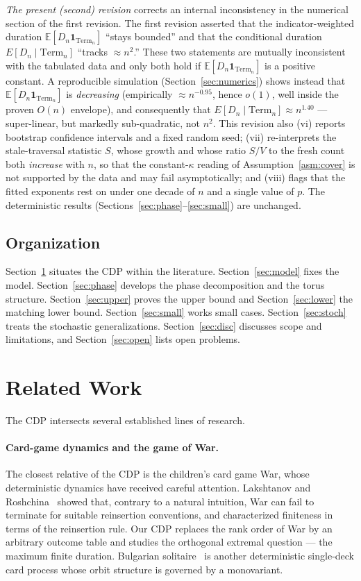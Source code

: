 \documentclass[11pt]{article}
\theoremstyle{definition}
\theoremstyle{remark}
\newcommand{\Term}{\mathrm{Term}}
\newcommand{\E}{\mathbb{E}}
\begin{document}
\emph{The present (second) revision} corrects an internal inconsistency in the numerical section of the first
revision. The first revision asserted that the indicator-weighted duration $\E[D_n\mathbf 1_{\Term_n}]$ ``stays
bounded'' and that the conditional duration $E[D_n\mid\Term_n]$ ``tracks $\approx n^2$.'' These two statements
are mutually inconsistent with the tabulated data and only both hold if $\E[D_n\mathbf 1_{\Term_n}]$ is a positive
constant. A reproducible simulation (Section~\ref{sec:numerics}) shows instead that $\E[D_n\mathbf 1_{\Term_n}]$ is
\emph{decreasing} (empirically $\approx n^{-0.95}$, hence $o(1)$, well inside the proven $O(n)$ envelope), and
consequently that $E[D_n\mid\Term_n]\approx n^{1.40}$ --- super-linear, but markedly sub-quadratic, not $n^2$.
This revision also (vi) reports bootstrap confidence intervals and a fixed random seed; (vii) re-interprets the
stale-traversal statistic $S$, whose growth and whose ratio $S/V$ to the fresh count both \emph{increase} with $n$,
so that the constant-$\kappa$ reading of Assumption~\ref{asm:cover} is not supported by the data and may fail
asymptotically; and (viii) flags that the fitted exponents rest on under one decade of $n$ and a single value of $p$.
The deterministic results (Sections~\ref{sec:phase}--\ref{sec:small}) are unchanged.

\subsection{Organization}
Section~\ref{sec:related} situates the CDP within the literature. Section~\ref{sec:model} fixes the model.
Section~\ref{sec:phase} develops the phase decomposition and the torus structure. Section~\ref{sec:upper} proves the
upper bound and Section~\ref{sec:lower} the matching lower bound. Section~\ref{sec:small} works small cases.
Section~\ref{sec:stoch} treats the stochastic generalizations. Section~\ref{sec:disc} discusses scope and limitations,
and Section~\ref{sec:open} lists open problems.

\section{Related Work}\label{sec:related}
The CDP intersects several established lines of research.

\paragraph{Card-game dynamics and the game of War.}
The closest relative of the CDP is the children's card game War, whose deterministic dynamics have received
careful attention. Lakshtanov and Roshchina~\cite{LR} showed that, contrary to a natural intuition, War can fail
to terminate for suitable reinsertion conventions, and characterized finiteness in terms of the reinsertion rule.
Our CDP replaces the rank order of War by an arbitrary outcome table and studies the orthogonal extremal
question --- the maximum finite duration. Bulgarian solitaire~\cite{Brandt} is another deterministic single-deck
card process whose orbit structure is governed by a monovariant.
\end{document}
